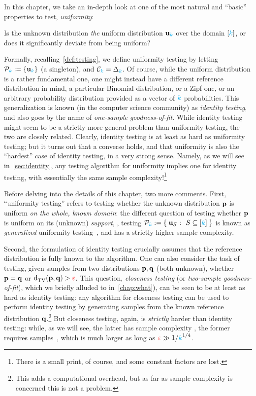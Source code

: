 In this chapter, we take an in-depth look at one of the most natural and ``basic'' properties to test, \emph{uniformity}: 
\begin{framed}
Is the unknown distribution \emph{the} uniform distribution $\mathbf{u}_{\textcolor{cyan}{k}}$ over the domain $[{\textcolor{cyan}{k}}]$, or does it significantly deviate from being uniform?
\end{framed}
Formally, recalling~\cref{def:testing}, we define uniformity testing by letting $\mathcal{P}_{\textcolor{cyan}{k}} := \{\mathbf{u}_{\textcolor{cyan}{k}}\}$ (a singleton), and $\mathcal{C}_{\textcolor{cyan}{k}}=\Delta_{{\textcolor{cyan}{k}}}$. Of course, while the uniform distribution is a rather fundamental one, one might instead have a different reference distribution in mind, \eg a particular Binomial distribution, or a Zipf one, or an arbitrary probability distribution provided as a vector of ${\textcolor{cyan}{k}}$ probabilities. This generalization is known (in the computer science community) as \emph{identity testing}, and also goes by the name of \emph{one-sample goodness-of-fit}. While identity testing might seem to be a strictly more general problem than uniformity testing, the two are closely related. Clearly, identity testing is at least as hard as uniformity testing; but it turns out that a converse holds, and that uniformity is also the ``hardest'' case of identity testing, in a very strong sense. Namely, as we will see in~\cref{sec:identity}, any testing algorithm for uniformity implies one for identity testing, with essentially the same sample complexity!\footnote{There is a small print, of course, and some constant factors are lost.}

Before delving into the details of this chapter, two more comments. First, ``uniformity testing'' refers to testing whether the unknown distribution $\mathbf{p}$ is uniform \emph{on the whole, known domain}: the different question of testing whether $\mathbf{p}$ is uniform on its (unknown) \emph{support}, \ie, testing $\property_\ab \eqdef \setOfSuchThat{\uniform_S}{ S \subseteq [\ab]}$ is known as \emph{generalized} uniformity testing~\citep{BatuC17}, and has a strictly higher sample complexity.

Second, the formulation of identity testing crucially assumes that the reference distribution is fully known to the algorithm. One can also consider the task of testing, given samples from two distributions $\mathbf{p},\mathbf{q}$ (both unknown), whether $\mathbf{p}=\mathbf{q}$ or $\totalvardist{\p}{\q}>\dst$. This question, \emph{closeness testing} (or \emph{two-sample goodness-of-fit}), which we briefly alluded to in~\cref{chap:what}), can be seen to be at least as hard as identity testing: any algorithm for closeness testing can be used to perform identity testing by generating \iid samples from the known reference distribution $\mathbf{q}$.\footnote{This adds a computational overhead, but as far as sample complexity is concerned this is not a problem.} But closeness testing, again, is \emph{strictly} harder than identity testing: while, as we will see, the latter has sample complexity \smash{$\Theta\big({\sqrt{\ab}/\dst^2\big)}$}, the former requires  samples~\citep{ChanDVV14}, which is much larger as long as $\textcolor{red}{\varepsilon} \gg 1/{\textcolor{cyan}{k}}^{1/4}$.\medskip


